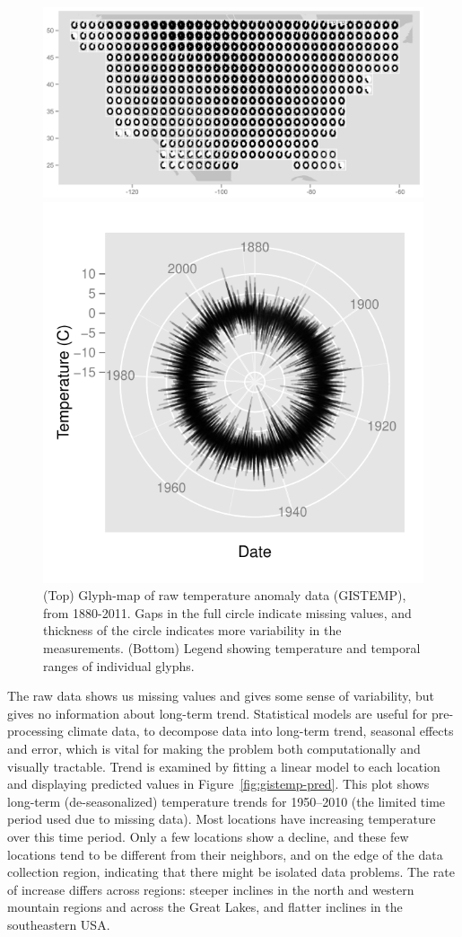 \documentclass[oneside]{article}
\begin{document}
\begin{figure}[htbp]
  \centering

  \includegraphics[width=1\linewidth]{gistemp-polar-raw}

  \includegraphics[width=0.33\linewidth]{gistemp-polar-legend}

  \caption{(Top) Glyph-map of raw temperature anomaly data (GISTEMP), from 1880-2011. Gaps in the full circle indicate missing values, and thickness of the circle indicates more variability in the measurements.  (Bottom) Legend showing temperature and temporal ranges of individual glyphs.}
  \label{fig:gistemp-raw}
\end{figure}

The raw data shows us missing values and gives some sense of variability, but gives no information about long-term trend. Statistical models are useful for pre-processing climate data, to decompose data into long-term trend, seasonal effects and error, which is vital for making the problem both computationally and visually tractable. Trend is examined by fitting a linear model to each location and displaying predicted values in Figure~\ref{fig:gistemp-pred}. This plot shows long-term (de-seasonalized) temperature trends for 1950--2010 (the limited time period used due to missing data). Most locations have increasing temperature over this time period. Only a few locations show a decline, and these few locations tend to be different from their neighbors, and on the edge of the data collection region, indicating that there might be isolated data problems. The rate of increase differs across regions: steeper inclines in the north and western mountain regions and across the Great Lakes, and flatter inclines in the southeastern USA.
\end{document}
